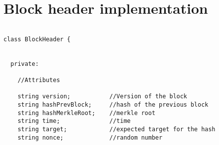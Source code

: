 \section{Block header implementation}
\begin{lstlisting}

class BlockHeader {


  private:

    //Attributes

    string version;           //Version of the block
    string hashPrevBlock;     //hash of the previous block
    string hashMerkleRoot;    //merkle root
    string time;              //time
    string target;            //expected target for the hash
    string nonce;             //random number

\end{lstlisting}
